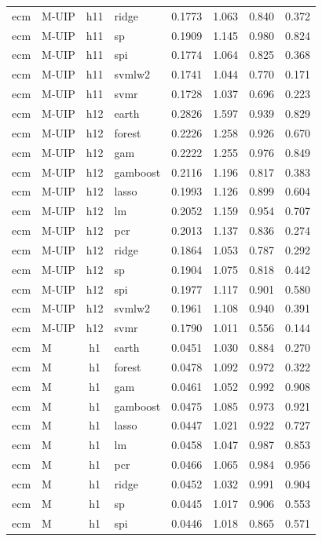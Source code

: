 \begin{ThreePartTable}
\begin{longtable}[t]{llclcccc}
ecm & M-UIP & h11 & ridge & 0.1773 & 1.063 & 0.840 & 0.372\\
ecm & M-UIP & h11 & sp & 0.1909 & 1.145 & 0.980 & 0.824\\
ecm & M-UIP & h11 & spi & 0.1774 & 1.064 & 0.825 & 0.368\\
ecm & M-UIP & h11 & svmlw2 & 0.1741 & 1.044 & 0.770 & 0.171\\
ecm & M-UIP & h11 & svmr & 0.1728 & 1.037 & 0.696 & 0.223\\
\addlinespace
ecm & M-UIP & h12 & earth & 0.2826 & 1.597 & 0.939 & 0.829\\
ecm & M-UIP & h12 & forest & 0.2226 & 1.258 & 0.926 & 0.670\\
ecm & M-UIP & h12 & gam & 0.2222 & 1.255 & 0.976 & 0.849\\
ecm & M-UIP & h12 & gamboost & 0.2116 & 1.196 & 0.817 & 0.383\\
ecm & M-UIP & h12 & lasso & 0.1993 & 1.126 & 0.899 & 0.604\\
ecm & M-UIP & h12 & lm & 0.2052 & 1.159 & 0.954 & 0.707\\
ecm & M-UIP & h12 & pcr & 0.2013 & 1.137 & 0.836 & 0.274\\
ecm & M-UIP & h12 & ridge & 0.1864 & 1.053 & 0.787 & 0.292\\
ecm & M-UIP & h12 & sp & 0.1904 & 1.075 & 0.818 & 0.442\\
ecm & M-UIP & h12 & spi & 0.1977 & 1.117 & 0.901 & 0.580\\
ecm & M-UIP & h12 & svmlw2 & 0.1961 & 1.108 & 0.940 & 0.391\\
ecm & M-UIP & h12 & svmr & 0.1790 & 1.011 & 0.556 & 0.144\\
\addlinespace
ecm & M & h1 & earth & 0.0451 & 1.030 & 0.884 & 0.270\\
ecm & M & h1 & forest & 0.0478 & 1.092 & 0.972 & 0.322\\
ecm & M & h1 & gam & 0.0461 & 1.052 & 0.992 & 0.908\\
ecm & M & h1 & gamboost & 0.0475 & 1.085 & 0.973 & 0.921\\
ecm & M & h1 & lasso & 0.0447 & 1.021 & 0.922 & 0.727\\
ecm & M & h1 & lm & 0.0458 & 1.047 & 0.987 & 0.853\\
ecm & M & h1 & pcr & 0.0466 & 1.065 & 0.984 & 0.956\\
ecm & M & h1 & ridge & 0.0452 & 1.032 & 0.991 & 0.904\\
ecm & M & h1 & sp & 0.0445 & 1.017 & 0.906 & 0.553\\
ecm & M & h1 & spi & 0.0446 & 1.018 & 0.865 & 0.571\\

\end{longtable}
\end{ThreePartTable}
